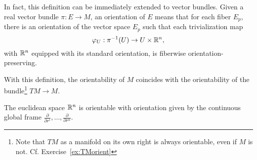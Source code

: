 \begin{remark}
  In fact, this definition can be immediately extended to vector bundles.
  Given a real vector bundle $\pi: E \to M$, an orientation of $E$ means that for each fiber $E_p$, there is an orientation of the vector space $E_p$ such that each trivialization map
  \begin{equation}
    \varphi_{U}:\pi^{-1}(U)\to U\times \mathbb{R}^{n},
  \end{equation}
  with $\mathbb{R}^n$ equipped with its standard orientation, is fiberwise orientation-preserving.

  With this definition, the orientability of $M$ coincides with the orientability of the bundle\footnote{Note that $TM$ as a manifold on its own right is always orientable, even if $M$ is not. Cf. Exercise~\ref{ex:TMorient}} $TM\to M$.
\end{remark}

\begin{example}
  The euclidean space $\mathbb{R}^n$ is orientable with orientation given by the continuous global frame $\frac{\partial}{\partial r^i},\ldots,\frac{\partial}{\partial r^n}$.
\end{example}

